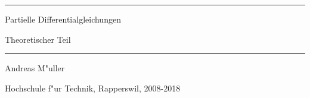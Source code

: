 \documentclass[a4paper,12pt]{book}
\begin{document}
\pagestyle{fancy}
\lhead{}
\rhead{}
\frontmatter
\newcommand\HRule{\noindent\rule{\linewidth}{1.5pt}}
\begin{titlepage}
\HRule
\vspace*{10pt}
\begin{flushright}
{\Huge
Partielle Differentialgleichungen}
\end{flushright}
\begin{flushright}
{\Large Theoretischer Teil}
\end{flushright}
\HRule
\begin{flushright}
\vspace{30pt}
\LARGE
Andreas M"uller
\end{flushright}
\begin{center}
Hochschule f"ur Technik, Rapperswil, 2008-2018
\end{center}
\end{titlepage}
\hypersetup{
    colorlinks=true,
    linktoc=all,
    linkcolor=blue
}
\tableofcontents
\newtheorem{satz}{Satz}[chapter]
\newtheorem{problem}[satz]{Problem}
\newtheorem{hilfssatz}[satz]{Hilfssatz}
\newtheorem{definition}[satz]{Definition}
\newtheorem{annahme}[satz]{Annahme}
\newtheorem{aufgabe}[satz]{Aufgabe}
\newenvironment{beispiel}[1][Beispiel]{%
\begin{proof}[#1]%
\renewcommand{\qedsymbol}{$\bigcirc$}
}{\end{proof}}
\mainmatter












\appendix

%

\end{document}
